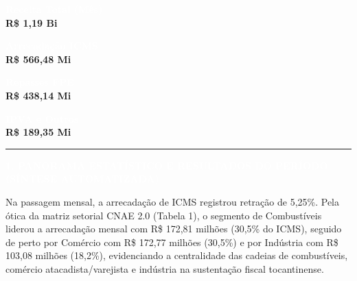 \documentclass[10pt,a4paper]{article}
\newcommand{\secaojornal}[1]{%
  \vspace{6pt}%
  {\noindent\colorbox{azulto}{%
    \parbox{\dimexpr\textwidth-2\fboxsep\relax}{%
      \vspace{3pt}\hspace{4pt}\textcolor{douradoto}{\rule{7pt}{7pt}}\hspace{6pt}%
      \textcolor{white}{\textbf{\normalsize \MakeUppercase{#1}}}\vspace{3pt}%
    }%
  }}%
  \vspace{4pt}%
}
\begin{document}
\vspace{4pt}

\noindent\colorbox{azulto}{\parbox[t][1.32cm][c]{0.225\textwidth}{\centering\scriptsize\textcolor{white}{\textbf{Receita Total (Mês)}}\\[3pt]{\large\textbf{\textcolor{douradoto}{R\$ 1,19 Bi}}}}}\hfill\colorbox{azulto}{\parbox[t][1.32cm][c]{0.225\textwidth}{\centering\scriptsize\textcolor{white}{\textbf{Arrecadação ICMS}}\\[3pt]{\large\textbf{\textcolor{douradoto}{R\$ 566,48 Mi}}}}}\hfill\colorbox{azulto}{\parbox[t][1.32cm][c]{0.225\textwidth}{\centering\scriptsize\textcolor{white}{\textbf{Repasses FPE}}\\[3pt]{\large\textbf{\textcolor{douradoto}{R\$ 438,14 Mi}}}}}\hfill\colorbox{azulto}{\parbox[t][1.32cm][c]{0.225\textwidth}{\centering\scriptsize\textcolor{white}{\textbf{IPVA e Outros}}\\[3pt]{\large\textbf{\textcolor{douradoto}{R\$ 189,35 Mi}}}}}
\vspace{5pt}


\secaojornal{1. Panorama Estatístico e Resultados do Período (Síntese Automatizada)}



\vspace{4pt}

Na passagem mensal, a arrecadação de ICMS registrou retração de 5,25\%. Pela ótica da matriz setorial CNAE 2.0 (Tabela 1), o segmento de Combustíveis liderou a arrecadação mensal com R\$ 172,81 milhões (30,5\% do ICMS), seguido de perto por Comércio com R\$ 172,77 milhões (30,5\%) e por Indústria com R\$ 103,08 milhões (18,2\%), evidenciando a centralidade das cadeias de combustíveis, comércio atacadista/varejista e indústria na sustentação fiscal tocantinense.

\vspace{4pt}
\end{document}
